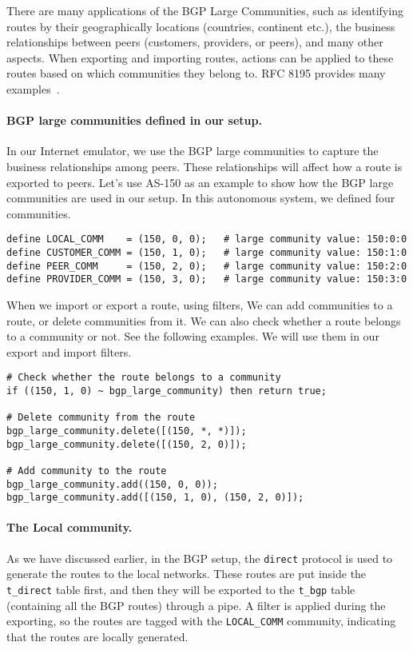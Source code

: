 There are many applications of the BGP Large Communities, such as 
identifying routes by their geographically locations (countries, 
continent etc.), the business relationships between peers (customers,
providers, or peers), and many other aspects. When exporting and importing 
routes, actions can be applied to these routes based on which
communities they belong to. RFC 8195 provides many 
examples~\cite{ref8195}.

\paragraph{BGP large communities defined in our setup.}
In our Internet emulator, we use the BGP large communities to 
capture the business relationships among peers. These relationships
will affect how a route is exported to peers. 
Let's use AS-150 as an example to show how the BGP large communities are used
in our setup. In this autonomous system, we defined four communities. 

\begin{lstlisting}
define LOCAL_COMM    = (150, 0, 0);   # large community value: 150:0:0
define CUSTOMER_COMM = (150, 1, 0);   # large community value: 150:1:0
define PEER_COMM     = (150, 2, 0);   # large community value: 150:2:0
define PROVIDER_COMM = (150, 3, 0);   # large community value: 150:3:0
\end{lstlisting}

When we import or export a route, using filters,
We can add communities to a route, or delete communities from it. 
We can also check whether a route belongs to a community or not. See the 
following examples. We will use them in our export and import filters. 

\begin{lstlisting}
# Check whether the route belongs to a community
if ((150, 1, 0) ~ bgp_large_community) then return true;

# Delete community from the route
bgp_large_community.delete([(150, *, *)]);
bgp_large_community.delete([(150, 2, 0)]);

# Add community to the route
bgp_large_community.add((150, 0, 0));
bgp_large_community.add([(150, 1, 0), (150, 2, 0)]);
\end{lstlisting}
 


\paragraph{The Local community.}
As we have discussed earlier, in the BGP setup, 
the \texttt{direct} protocol is used to generate the routes
to the local networks. These routes are put inside
the \texttt{t\_direct} table first, and then they
will be exported to the \texttt{t\_bgp} table (containing
all the BGP routes) through a pipe. 
A filter is applied during the exporting, so the 
routes are tagged with the \texttt{LOCAL\_COMM}
community, indicating that the routes are locally 
generated. 

